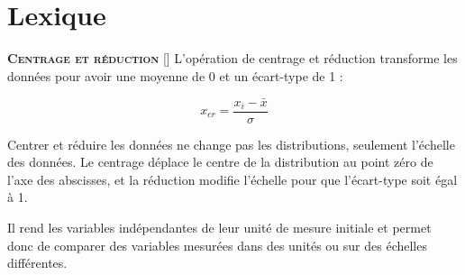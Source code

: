 \documentclass[10pt,french]{report}
\newcommand{\entreelex}[3][]{%
	{\large \textbf{\textsc{#2}}} %
	\if\relax\detokenize{#1}\relax %
	\else %
	\raisebox{0.15ex}{\scalebox{0.7}{$\Diamond$}} %
	[#1] %
	\fi
	\raisebox{0.13ex}{\scalebox{0.75}{$\blacksquare$}} #3 %
}
\begin{document}
	\chapter{Lexique}

	\label{Centrage et réduction}
	\entreelex{Centrage et réduction}{L'opération de centrage et réduction transforme les données pour avoir une moyenne de 0 et un écart-type de 1 :

	\begin{equation}
		x_{cr}=\frac{x_{i}-\bar{x}}{\sigma}
	\end{equation}

	 Centrer et réduire les données ne change pas les distributions, seulement l'échelle des données. Le centrage déplace le centre de la distribution au point zéro de l'axe des abscisses, et la réduction modifie l'échelle pour que l'écart-type soit égal à 1.

	 Il rend les variables indépendantes de leur unité de mesure initiale et permet donc de comparer des variables mesurées dans des unités ou sur des échelles différentes.}
\end{document}
